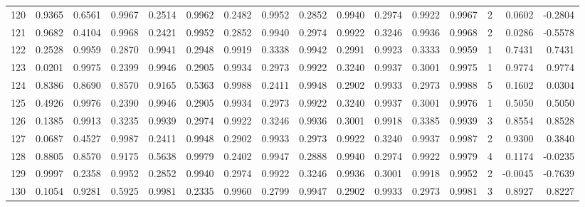 \begin{tabular}{lrrrrrrrrrrrrrrr}
120 &      0.9365 &  0.6561 &  0.9967 &  0.2514 &  0.9962 &  0.2482 &  0.9952 &  0.2852 &  0.9940 &  0.2974 &   0.9922 &     0.9967 &      2 &                    0.0602 &                    -0.2804 \\
121 &      0.9682 &  0.4104 &  0.9968 &  0.2421 &  0.9952 &  0.2852 &  0.9940 &  0.2974 &  0.9922 &  0.3246 &   0.9936 &     0.9968 &      2 &                    0.0286 &                    -0.5578 \\
122 &      0.2528 &  0.9959 &  0.2870 &  0.9941 &  0.2948 &  0.9919 &  0.3338 &  0.9942 &  0.2991 &  0.9923 &   0.3333 &     0.9959 &      1 &                    0.7431 &                     0.7431 \\
123 &      0.0201 &  0.9975 &  0.2399 &  0.9946 &  0.2905 &  0.9934 &  0.2973 &  0.9922 &  0.3240 &  0.9937 &   0.3001 &     0.9975 &      1 &                    0.9774 &                     0.9774 \\
124 &      0.8386 &  0.8690 &  0.8570 &  0.9165 &  0.5363 &  0.9988 &  0.2411 &  0.9948 &  0.2902 &  0.9933 &   0.2973 &     0.9988 &      5 &                    0.1602 &                     0.0304 \\
125 &      0.4926 &  0.9976 &  0.2390 &  0.9946 &  0.2905 &  0.9934 &  0.2973 &  0.9922 &  0.3240 &  0.9937 &   0.3001 &     0.9976 &      1 &                    0.5050 &                     0.5050 \\
126 &      0.1385 &  0.9913 &  0.3235 &  0.9939 &  0.2974 &  0.9922 &  0.3246 &  0.9936 &  0.3001 &  0.9918 &   0.3385 &     0.9939 &      3 &                    0.8554 &                     0.8528 \\
127 &      0.0687 &  0.4527 &  0.9987 &  0.2411 &  0.9948 &  0.2902 &  0.9933 &  0.2973 &  0.9922 &  0.3240 &   0.9937 &     0.9987 &      2 &                    0.9300 &                     0.3840 \\
128 &      0.8805 &  0.8570 &  0.9175 &  0.5638 &  0.9979 &  0.2402 &  0.9947 &  0.2888 &  0.9940 &  0.2974 &   0.9922 &     0.9979 &      4 &                    0.1174 &                    -0.0235 \\
129 &      0.9997 &  0.2358 &  0.9952 &  0.2852 &  0.9940 &  0.2974 &  0.9922 &  0.3246 &  0.9936 &  0.3001 &   0.9918 &     0.9952 &      2 &                   -0.0045 &                    -0.7639 \\
130 &      0.1054 &  0.9281 &  0.5925 &  0.9981 &  0.2335 &  0.9960 &  0.2799 &  0.9947 &  0.2902 &  0.9933 &   0.2973 &     0.9981 &      3 &                    0.8927 &                     0.8227 \\

\end{tabular}
